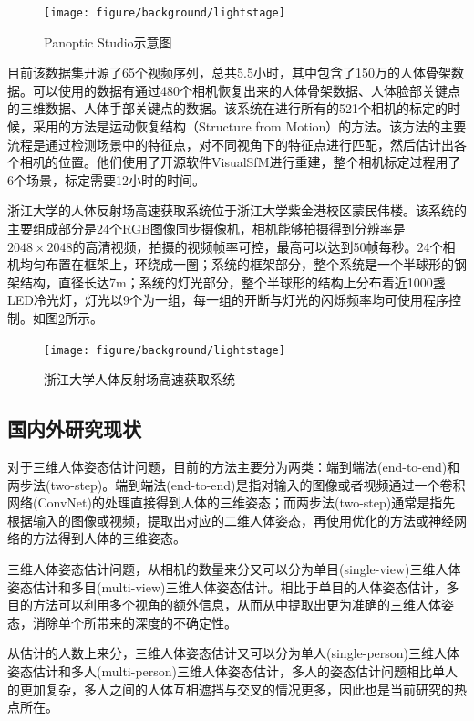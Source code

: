 \begin{figure}[htbp]
    \centering
    \texttt{[image: figure/background/lightstage]}
    \caption{\label{fig:panoptic} Panoptic Studio示意图\cite{Panoptic}}
\end{figure}

目前该数据集开源了65个视频序列，总共5.5小时，其中包含了150万的人体骨架数据。可以使用的数据有通过480个相机恢复出来的人体骨架数据、人体脸部关键点的三维数据、人体手部关键点的数据。该系统在进行所有的521个相机的标定的时候，采用的方法是运动恢复结构（Structure from Motion）的方法。该方法的主要流程是通过检测场景中的特征点，对不同视角下的特征点进行匹配，然后估计出各个相机的位置。他们使用了开源软件VisualSfM进行重建，整个相机标定过程用了6个场景，标定需要12小时的时间。

浙江大学的人体反射场高速获取系统位于浙江大学紫金港校区蒙民伟楼。该系统的主要组成部分是24个RGB图像同步摄像机，相机能够拍摄得到分辨率是\(2048\times 2048\)的高清视频，拍摄的视频帧率可控，最高可以达到50帧每秒。24个相机均匀布置在框架上，环绕成一圈；系统的框架部分，整个系统是一个半球形的钢架结构，直径长达7m；系统的灯光部分，整个半球形的结构上分布着近1000盏LED冷光灯，灯光以9个为一组，每一组的开断与灯光的闪烁频率均可使用程序控制。如图\ref{fig:lightstage}所示。
\begin{figure}[htbp]
    \centering
    \texttt{[image: figure/background/lightstage]}
    \caption{\label{fig:lightstage} 浙江大学人体反射场高速获取系统}
\end{figure}

\subsection{国内外研究现状}

对于三维人体姿态估计问题，目前的方法主要分为两类：端到端法(end-to-end)\autocite{pavlakos2017coarse}和两步法(two-step)\autocite{zhou2016sparseness}。端到端法(end-to-end)\autocite{pavlakos2017coarse}是指对输入的图像或者视频通过一个卷积网络(ConvNet)的处理直接得到人体的三维姿态；而两步法(two-step)\autocite{zhou2016sparseness}通常是指先根据输入的图像或视频，提取出对应的二维人体姿态，再使用优化的方法或神经网络的方法得到人体的三维姿态。

三维人体姿态估计问题，从相机的数量来分又可以分为单目(single-view)三维人体姿态估计和多目(multi-view)三维人体姿态估计。相比于单目的人体姿态估计，多目的方法可以利用多个视角的额外信息，从而从中提取出更为准确的三维人体姿态，消除单个所带来的深度的不确定性。

从估计的人数上来分，三维人体姿态估计又可以分为单人(single-person)三维人体姿态估计和多人(multi-person)三维人体姿态估计，多人的姿态估计问题相比单人的更加复杂，多人之间的人体互相遮挡与交叉的情况更多，因此也是当前研究的热点所在。

